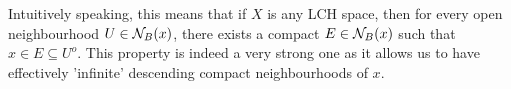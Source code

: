 \documentclass[../../main.tex]{subfiles}
\begin{document}
\begin{remark}
    Intuitively speaking, this means that if $X$ is any LCH space, then for every open neighbourhood $U\in\mathcal{N}_B({x})$, there exists a compact $E\in\mathcal{N}_B({x})$ such that $x\in E\subseteq U^o$. This property is indeed a very strong one as it allows us to have effectively 'infinite' descending compact neighbourhoods of $x$.
\end{remark} 
\end{document}
